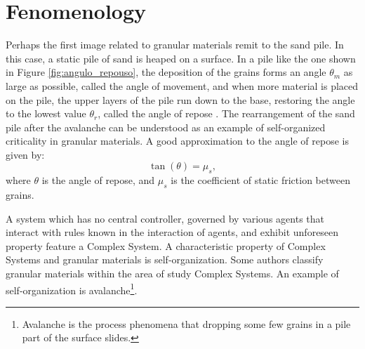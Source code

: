 \section{Fenomenology}
\label{subchap:Fenomenologia}
    Perhaps the first image related to granular materials remit to the sand pile. In this case, a static pile of sand is heaped on a surface. In a pile like the one shown in Figure \ref{fig:angulo_repouso}, the deposition of the grains forms an angle $\theta _m$ as large as possible, called the angle of movement, and when more material is placed on the pile, the upper layers of the pile run down to the base, restoring the angle to the lowest value $\theta _r$, called the angle of repose \cite{Sands_Powders_and_Grains, Granular_Physics}. The rearrangement of the sand pile after the avalanche can be understood as an example of self-organized criticality in granular materials. A good approximation to the angle of repose is given by:
    \begin{equation}
        \label{equ:atrito}
        \tan(\theta) = \mu _s ,
    \end{equation}
where $\theta$ is the angle of repose, and $\mu _s$ is the coefficient of static friction between grains.

    A system which has no central controller, governed by various agents that interact with rules known in the interaction of agents, and exhibit unforeseen property feature a Complex System. A characteristic property of Complex Systems and granular materials is self-organization. Some authors \cite{Avalanche_Dynamics_in_a_Pile_of_Rice, Avalanche_Prediction_in_a_Self-Organized_Pile_of_Beads, Mixing_and_Segregation_of_Granular_Materials, Measuring_the_flowing_properties_of_powders_and_grains, Revisiting_localized_deformation_in_sand_with_complex_systems, Granular_matter_and_networks, Patterns_and_collective_behavior_in_granular_media, Florent-Tese} classify granular materials within the area of study Complex Systems. An example of self-organization is avalanche\footnote{Avalanche is the process phenomena that dropping some few grains in a pile part of the surface slides.}.

